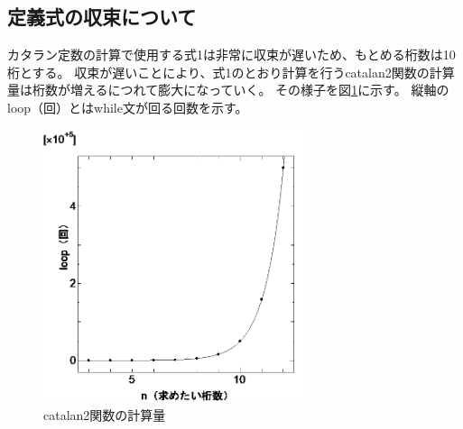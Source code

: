 \documentclass[a4j,dvipdfmx,titlepage]{jarticle}
\begin{document}
\subsection{定義式の収束について}
カタラン定数の計算で使用する式1は非常に収束が遅いため、もとめる桁数は10桁とする。
収束が遅いことにより、式1のとおり計算を行うcatalan2関数の計算量は桁数が増えるにつれて膨大になっていく。
その様子を図\ref{teigi}に示す。 縦軸のloop（回）とはwhile文が回る回数を示す。
\begin{figure}[H]
  \begin{center}
    \includegraphics[height=8.0cm]{teigi.png}
    \caption{catalan2関数の計算量}
    \label{teigi}
  \end{center}
\end{figure}



\end{document}
